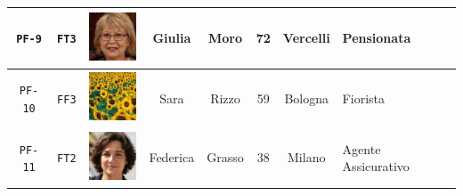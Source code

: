 \begin{table}[H]
\begin{tabular}[c]{ |c|c|m{1.5cm}|c|c|c|c|m{1.85cm}| }
	\hline
	\cellcolor[HTML]{b0d7ff}\texttt{PF-9}&\cellcolor[HTML]{e6f2ff}\texttt{FT3}&	
	\vspace{.15cm}		
	\includegraphics[height=1.5cm]{immagini/FT3.jpg}
	&Giulia&Moro&72&Vercelli&Pensionata\\
	
	\hline
	\cellcolor[HTML]{b0d7ff}\texttt{PF-10}&\cellcolor[HTML]{e6f2ff}\texttt{FF3}	&
	\vspace{.15cm}
	\includegraphics[height=1.5cm]{immagini/FF3.jpg}
	&Sara&Rizzo&59&Bologna&Fiorista\\
	\hline
	\cellcolor[HTML]{b0d7ff}\texttt{PF-11}&\cellcolor[HTML]{e6f2ff}\texttt{FT2}	&
	\vspace{.15cm}
	\includegraphics[height=1.5cm]{immagini/FT2.jpg}			
	&Federica&Grasso&38&Milano&Agente \newline Assicurativo\\	
	 \hline	 	
\end{tabular}
\label{table:attackers}	 
\end{table}
\newpage
